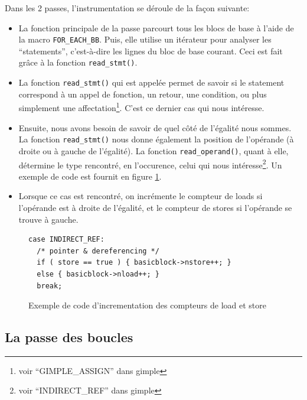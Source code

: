 Dans les 2 passes, l'instrumentation se déroule de la façon suivante:\\

\begin{itemize}

\item La fonction principale de la passe parcourt tous les blocs de base à l'aide de la macro \verb#FOR_EACH_BB#. Puis, elle utilise un itérateur pour analyser les ``statements'', c'est-à-dire les lignes du bloc de base courant. Ceci est fait grâce à la fonction \verb#read_stmt()#.\\

\item La fonction \verb#read_stmt()# qui est appelée permet de savoir si le statement correspond à un appel de fonction, un retour, une condition, ou plus simplement une affectation\footnote{voir ``GIMPLE\_ASSIGN'' dans gimple}. C'est ce dernier cas qui nous intéresse.\\

\item Ensuite, nous avons besoin de savoir de quel côté de l'égalité nous sommes. La fonction \verb#read_stmt()# nous donne également la position de l'opérande (à droite ou à gauche de l'égalité). La fonction \verb#read_operand()#, quant à elle, détermine le type rencontré, en l'occurence, celui qui nous intéresse\footnote{voir ``INDIRECT\_REF'' dans gimple}. Un exemple de code est fournit en figure \ref{fig:count_example}.\\

\item Lorsque ce cas est rencontré, on incrémente le compteur de loads si l'opérande est à droite de l'égalité, et le compteur de stores si l'opérande se trouve à gauche.\\

\end{itemize}

\begin{figure}[here]
  \centering
\begin{verbatim}
case INDIRECT_REF:
  /* pointer & dereferencing */
  if ( store == true ) { basicblock->nstore++; }
  else { basicblock->nload++; }
  break;
\end{verbatim}
  \caption{Exemple de code d'incrementation des compteurs de load et store}
  \label{fig:count_example}
\end{figure}

\subsection{La passe des boucles}

